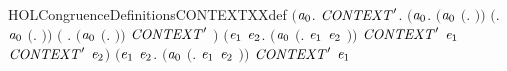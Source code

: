 \begin{SaveVerbatim}{HOLCongruenceDefinitionsCONTEXTXXdef}
\HOLTokenTurnstile{}  \HOLSymConst{\ensuremath{=}}
   \ensuremath{(}\HOLTokenLambda{}\ensuremath{\HOLBoundVar{a}\sb{\mathrm{0}}}.
        \HOLSymConst{\HOLTokenForall{}}\ensuremath{\HOLBoundVar{CONTEXT}\sp{\prime}}.
            \ensuremath{(}\HOLSymConst{\HOLTokenForall{}}\ensuremath{\HOLBoundVar{a}\sb{\mathrm{0}}}.
                 \ensuremath{(}\ensuremath{\HOLBoundVar{a}\sb{\mathrm{0}}} \HOLSymConst{\ensuremath{=}} \ensuremath{(}\HOLTokenLambda{}. \ensuremath{)}\ensuremath{)} \HOLSymConst{\HOLTokenDisj{}} \ensuremath{(}\HOLSymConst{\HOLTokenExists{}}. \ensuremath{\HOLBoundVar{a}\sb{\mathrm{0}}} \HOLSymConst{\ensuremath{=}} \ensuremath{(}\HOLTokenLambda{}. \ensuremath{)}\ensuremath{)} \HOLSymConst{\HOLTokenDisj{}}
                 \ensuremath{(}\HOLSymConst{\HOLTokenExists{}} . \ensuremath{(}\ensuremath{\HOLBoundVar{a}\sb{\mathrm{0}}} \HOLSymConst{\ensuremath{=}} \ensuremath{(}\HOLTokenLambda{}. \HOLSymConst{\ensuremath{\ldotp}} \ensuremath{)}\ensuremath{)} \HOLSymConst{\HOLTokenConj{}} \ensuremath{\HOLBoundVar{CONTEXT}\sp{\prime}} \ensuremath{)} \HOLSymConst{\HOLTokenDisj{}}
                 \ensuremath{(}\HOLSymConst{\HOLTokenExists{}}\ensuremath{\HOLBoundVar{e}\sb{\mathrm{1}}} \ensuremath{\HOLBoundVar{e}\sb{\mathrm{2}}}.
                      \ensuremath{(}\ensuremath{\HOLBoundVar{a}\sb{\mathrm{0}}} \HOLSymConst{\ensuremath{=}} \ensuremath{(}\HOLTokenLambda{}. \ensuremath{\HOLBoundVar{e}\sb{\mathrm{1}}}  \HOLSymConst{\ensuremath{+}} \ensuremath{\HOLBoundVar{e}\sb{\mathrm{2}}} \ensuremath{)}\ensuremath{)} \HOLSymConst{\HOLTokenConj{}} \ensuremath{\HOLBoundVar{CONTEXT}\sp{\prime}} \ensuremath{\HOLBoundVar{e}\sb{\mathrm{1}}} \HOLSymConst{\HOLTokenConj{}}
                      \ensuremath{\HOLBoundVar{CONTEXT}\sp{\prime}} \ensuremath{\HOLBoundVar{e}\sb{\mathrm{2}}}\ensuremath{)} \HOLSymConst{\HOLTokenDisj{}}
                 \ensuremath{(}\HOLSymConst{\HOLTokenExists{}}\ensuremath{\HOLBoundVar{e}\sb{\mathrm{1}}} \ensuremath{\HOLBoundVar{e}\sb{\mathrm{2}}}.
                      \ensuremath{(}\ensuremath{\HOLBoundVar{a}\sb{\mathrm{0}}} \HOLSymConst{\ensuremath{=}} \ensuremath{(}\HOLTokenLambda{}. \ensuremath{\HOLBoundVar{e}\sb{\mathrm{1}}}  \HOLSymConst{\ensuremath{\mid}} \ensuremath{\HOLBoundVar{e}\sb{\mathrm{2}}} \ensuremath{)}\ensuremath{)} \HOLSymConst{\HOLTokenConj{}} \ensuremath{\HOLBoundVar{CONTEXT}\sp{\prime}} \ensuremath{\HOLBoundVar{e}\sb{\mathrm{1}}} \HOLSymConst{\HOLTokenConj{}}

\end{SaveVerbatim}
